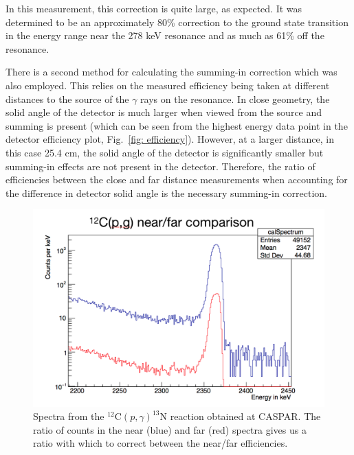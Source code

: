 \noindent In this measurement, this correction is quite large, as expected. It was determined to be an approximately 80\% correction to the ground state transition in the energy range near the 278 keV resonance and as much as 61\% off the resonance.

There is a second method for calculating the summing-in correction which was also employed. This relies on the measured efficiency being taken at different distances to the source of the $\gamma$ rays on the resonance. In close geometry, the solid angle of the detector is much larger when viewed from the source and summing is present (which can be seen from the highest energy data point in the detector efficiency plot, Fig.\ \ref{fig: efficiency}). However, at a larger distance, in this case 25.4 cm, the solid angle of the detector is significantly smaller but summing-in effects are not present in the detector. Therefore, the ratio of efficiencies between the close and far distance measurements when accounting for the difference in detector solid angle is the necessary summing-in correction. 


\begin{figure}
\centering
\includegraphics[width=\linewidth]{figures/carbonComparison.png}
\caption{Spectra from the $^{12}$C$\left( p,\gamma \right) ^{13}$N reaction obtained at CASPAR. The ratio of counts in the near (blue) and far (red) spectra gives us a ratio with which to correct between the near/far efficiencies. }
\label{fig: 12cpg}
\end{figure}

